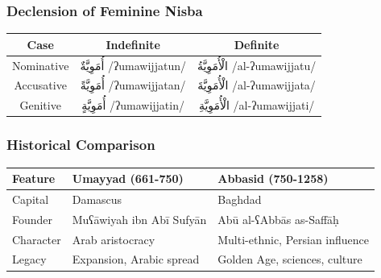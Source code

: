 \documentclass[letterpaper,12pt]{article}
\begin{document}
\subsubsection*{Declension of Feminine Nisba}
\begin{tabular}{|c|c|c|}
\hline
\textbf{Case} & \textbf{Indefinite} & \textbf{Definite} \\
\hline
Nominative & \textarabic{أُمَوِيَّةٌ} /ʔumawijjatun/ & \textarabic{الْأُمَوِيَّةُ} /al-ʔumawijjatu/ \\
\hline
Accusative & \textarabic{أُمَوِيَّةً} /ʔumawijjatan/ & \textarabic{الْأُمَوِيَّةَ} /al-ʔumawijjata/ \\
\hline
Genitive & \textarabic{أُمَوِيَّةٍ} /ʔumawijjatin/ & \textarabic{الْأُمَوِيَّةِ} /al-ʔumawijjati/ \\
\hline
\end{tabular}

\subsubsection*{Historical Comparison}
\begin{tabular}{|l|p{5cm}|p{5cm}|}
\hline
\textbf{Feature} & \textbf{Umayyad (661-750)} & \textbf{Abbasid (750-1258)} \\
\hline
Capital & Damascus & Baghdad \\
\hline
Founder & Muʕāwiyah ibn Abī Sufyān & Abū al-ʕAbbās as-Saffāḥ \\
\hline
Character & Arab aristocracy & Multi-ethnic, Persian influence \\
\hline
Legacy & Expansion, Arabic spread & Golden Age, sciences, culture \\
\hline
\end{tabular}
\end{document}
